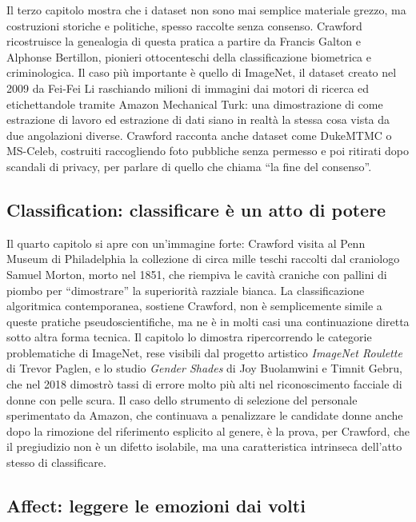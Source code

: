 \documentclass[a4paper,11pt]{article}
\begin{document}
Il terzo capitolo mostra che i dataset non sono mai semplice materiale grezzo, ma costruzioni storiche e politiche, spesso raccolte senza consenso. Crawford ricostruisce la genealogia di questa pratica a partire da Francis Galton e Alphonse Bertillon, pionieri ottocenteschi della classificazione biometrica e criminologica. Il caso più importante è quello di ImageNet, il dataset creato nel 2009 da Fei-Fei Li raschiando milioni di immagini dai motori di ricerca ed etichettandole tramite Amazon Mechanical Turk: una dimostrazione di come estrazione di lavoro ed estrazione di dati siano in realtà la stessa cosa vista da due angolazioni diverse. Crawford racconta anche dataset come DukeMTMC o MS-Celeb, costruiti raccogliendo foto pubbliche senza permesso e poi ritirati dopo scandali di privacy, per parlare di quello che chiama ``la fine del consenso''.

\subsection{Classification: classificare è un atto di potere}

Il quarto capitolo si apre con un'immagine forte: Crawford visita al Penn Museum di Philadelphia la collezione di circa mille teschi raccolti dal craniologo Samuel Morton, morto nel 1851, che riempiva le cavità craniche con pallini di piombo per ``dimostrare'' la superiorità razziale bianca. La classificazione algoritmica contemporanea, sostiene Crawford, non è semplicemente simile a queste pratiche pseudoscientifiche, ma ne è in molti casi una continuazione diretta sotto altra forma tecnica. Il capitolo lo dimostra ripercorrendo le categorie problematiche di ImageNet, rese visibili dal progetto artistico \emph{ImageNet Roulette} di Trevor Paglen, e lo studio \emph{Gender Shades} di Joy Buolamwini e Timnit Gebru, che nel 2018 dimostrò tassi di errore molto più alti nel riconoscimento facciale di donne con pelle scura. Il caso dello strumento di selezione del personale sperimentato da Amazon, che continuava a penalizzare le candidate donne anche dopo la rimozione del riferimento esplicito al genere, è la prova, per Crawford, che il pregiudizio non è un difetto isolabile, ma una caratteristica intrinseca dell'atto stesso di classificare.

\subsection{Affect: leggere le emozioni dai volti}
\end{document}
